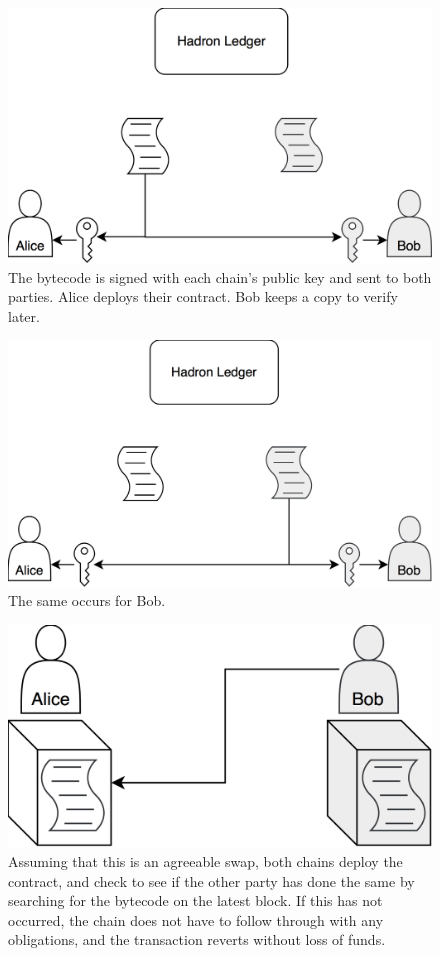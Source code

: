 \documentclass{%
	article}
\begin{document}
\begin{figure}[H]
\centering
\includegraphics[scale=0.112]{fig2.png}
\caption{\small\textnormal{The bytecode is signed with each chain's public key and sent to both parties. Alice deploys their contract. Bob keeps a copy to verify later.}}
\end{figure}

\begin{figure}[H]
\centering
\includegraphics[scale=0.112]{fig3.png}
\caption{\small\textnormal{The same occurs for Bob.}}
\end{figure}

\begin{figure}[H]
\centering
\includegraphics[scale=0.112]{fig4.png}
\caption{\small\textnormal{Assuming that this is an agreeable swap, both chains deploy the contract, and check to see if the other party has done the same by searching for the bytecode on the latest block. If this has not occurred, the chain does not have to follow through with any obligations, and the transaction reverts without loss of funds.}}
\end{figure}
\end{document}
